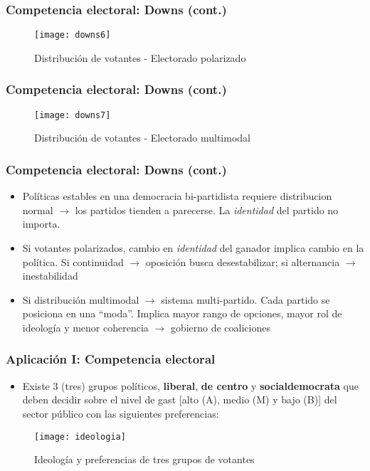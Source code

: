 \documentclass[14pt,aspectratio=169]{beamer}
\begin{document}
     \begin{frame}\frametitle{Competencia electoral: Downs (cont.)}
  \begin{figure}[htbp] \vspace{-1cm}
  \centering
  \texttt{[image: downs6]} \vspace{-1cm}
  \caption{Distribución de votantes - Electorado polarizado}
  \label{fig:3}
\end{figure}
\end{frame}

 \begin{frame}\frametitle{Competencia electoral: Downs (cont.)}
  \begin{figure}[htbp] \vspace{-1cm}
  \centering
  \texttt{[image: downs7]} \vspace{-1cm}
  \caption{Distribución de votantes - Electorado multimodal}
  \label{fig:3}
\end{figure}
    \end{frame}


\begin{frame}\frametitle{Competencia electoral: Downs (cont.)}
  \begin{itemize}
  \item Políticas estables en una democracia bi-partidista
    requiere distribucion normal
    $\longrightarrow$ los partidos tienden a parecerse. La \textit{identidad} del partido no importa.
    \item Si votantes polarizados, cambio en \textit{identidad} del
      ganador implica cambio en la política. Si continuidad
      $\longrightarrow$ oposición busca desestabilizar; si alternancia $\longrightarrow$ inestabilidad
      \item Si distribución multimodal $\longrightarrow$ sistema
        multi-partido. Cada partido se posiciona en una ``moda''. Implica mayor rango de opciones, mayor rol
        de ideología y menor coherencia $\longrightarrow$ gobierno de coaliciones
    \end{itemize}
  \end{frame}

    
    
\begin{frame}\frametitle{Aplicación I: Competencia electoral}
\begin{itemize}
\item Existe 3 (tres) grupos políticos, \textbf{liberal}, \textbf{de
    centro} y \textbf{socialdemocrata} que deben decidir sobre el
  nivel de gast [alto (A), medio (M) y bajo (B)] del sector público con las siguientes preferencias:
\end{itemize}
\begin{figure}[htbp] \vspace{-1cm}
  \centering
  \texttt{[image: ideologia]} \vspace{-1cm}
  \caption{Ideología y preferencias de tres grupos de votantes}
  \label{fig:3}
\end{figure}
\end{frame}
\end{document}
